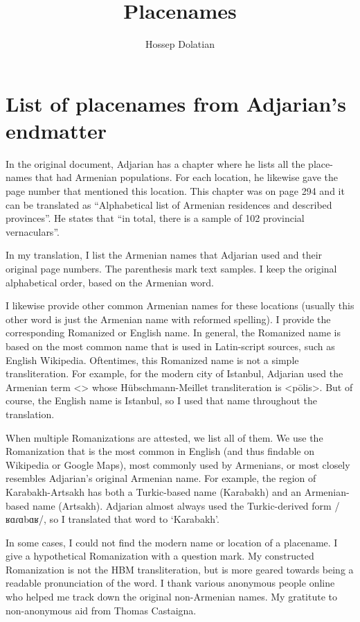 \documentclass[output=paper]{langscibook}
\title{Placenames}
\author{Hossep Dolatian\affiliation{Stony Brook University}}
\begin{document}
\maketitle
\label{chapter:names}

\section{List of placenames from Adjarian's endmatter}
In the original document, Adjarian has a chapter where he lists all the place-names that had Armenian populations. For each location, he likewise gave the page number that mentioned this location. This chapter was on page 294 and it can be translated as ``Alphabetical list of Armenian residences and described provinces''. He states that ``in total, there is a sample of 102 provincial vernaculars''. 

In my translation, I list the Armenian names that Adjarian used and their original page numbers. The parenthesis mark text samples. I keep the original alphabetical order, based on the Armenian word.

I likewise provide other common Armenian names for these locations (usually this other word is just the Armenian name with reformed spelling). I provide  the corresponding Romanized or English name. In general, the Romanized name is based on the most common name that is used in Latin-script sources, such as English Wikipedia. Oftentimes, this Romanized name is not a simple transliteration. For example, for the modern city of Istanbul, Adjarian used the Armenian term  <> whose Hübschmann-Meillet transliteration is <pōlis>. But of course, the English name is Istanbul, so I used that name throughout the translation. 

\begin{sloppypar}
When multiple Romanizations are attested, we list all of them. We use the Romanization that is the most common in English (and thus findable on Wikipedia or Google Maps), most commonly used by Armenians, or most closely resembles Adjarian's original Armenian name. For example, the region of Karabakh-Artsakh has both a Turkic-based name (Karabakh) and an Armenian-based name (Artsakh). Adjarian almost always used the Turkic-derived form  /ʁɑɾɑbɑʁ/,   so I translated that word to `Karabakh'. 
\end{sloppypar}

In some cases, I could not find the modern name or location of a placename. I give a hypothetical Romanization  with a question mark. My constructed Romanization is not the HBM transliteration, but is more geared towards being a readable pronunciation of the word. I thank various anonymous people online who helped me track down the original non-Armenian names. My gratitute to non-anonymous  aid from Thomas Castaigna.  
\end{document}
